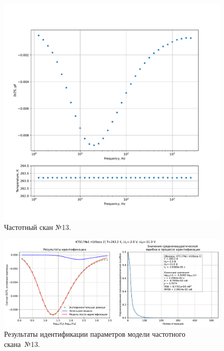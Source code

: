 \begin{figure}[!ht]
    \centering
    \includegraphics[width=1\textwidth]{../plots/КТ117№1_п1(база 2)_2500Гц-1Гц_1пФ_-10С_-2В-11В_100мВ_20мкс_шаг_0,1.pdf}
    \caption{Частотный скан №13.}
    \label{pic:frequency_scan_13}
\end{figure}

\begin{figure}[!ht]
    \centering
    \includegraphics[width=1\textwidth]{../plots/КТ117№1_п1(база 2)_2500Гц-1Гц_1пФ_-10С_-2В-11В_100мВ_20мкс_шаг_0,1_model.pdf}
    \caption{Результаты идентификации параметров модели частотного скана~№13.}
    \label{pic:frequency_scan_model13}
\end{figure}

\pagebreak


